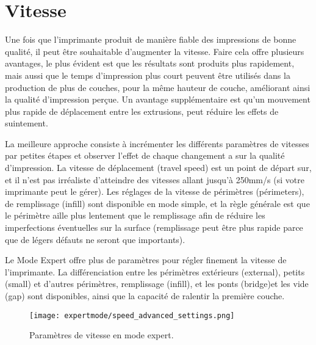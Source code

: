 
\section{Vitesse} %
\label{sec:speed}

Une fois que l'imprimante produit de manière fiable des impressions de bonne qualité, il peut être souhaitable d'augmenter la vitesse. Faire cela offre plusieurs avantages, le plus évident est que les résultats sont produits plus rapidement, mais aussi que le temps d'impression plus court peuvent être utilisés dans la production de plus de couches, pour la même hauteur de couche, améliorant ainsi la qualité d'impression perçue. Un avantage supplémentaire est qu'un mouvement plus rapide de déplacement entre les extrusions, peut réduire les effets de suintement.

La meilleure approche consiste à incrémenter les différents paramètres de vitesses par petites étapes et observer l'effet de chaque changement a sur la qualité d'impression. La vitesse de déplacement (travel speed) est un point de départ sur, et il n'est pas irréaliste d'atteindre des vitesses allant jusqu'à 250mm/s (si votre imprimante peut le gérer). Les réglages de la vitesse de périmètres (périmeters), de remplissage (infill) sont disponible en mode simple, et la règle générale est que le périmètre aille plus lentement que le remplissage afin de réduire les imperfections éventuelles sur la surface (remplissage peut être plus rapide parce que de légers défauts ne seront que importants).

Le Mode Expert offre plus de paramètres pour régler finement la vitesse de l'imprimante. La différenciation entre les périmètres extérieurs (external), petits (small) et d'autres périmètres, remplissage (infill), et les ponts (bridge)et les vide (gap) sont disponibles, ainsi que la capacité de ralentir la première couche.

\begin{figure}[H]
\centering
\texttt{[image: expertmode/speed\_advanced\_settings.png]}
\caption{Paramètres de vitesse en mode expert.}
\label{fig:speed_advanced_settings}
\end{figure}


